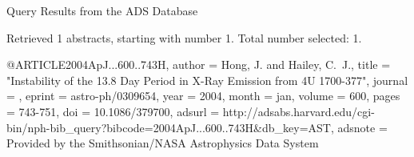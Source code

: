 Query Results from the ADS Database


Retrieved 1 abstracts, starting with number 1.  Total number selected: 1.

@ARTICLE{2004ApJ...600..743H,
   author = {{Hong}, J. and {Hailey}, C.~J.},
    title = "{Instability of the 13.8 Day Period in X-Ray Emission from 4U 1700-377}",
  journal = {\apj},
   eprint = {astro-ph/0309654},
     year = 2004,
    month = jan,
   volume = 600,
    pages = {743-751},
      doi = {10.1086/379700},
   adsurl = {http://adsabs.harvard.edu/cgi-bin/nph-bib_query?bibcode=2004ApJ...600..743H&db_key=AST},
  adsnote = {Provided by the Smithsonian/NASA Astrophysics Data System}
}


